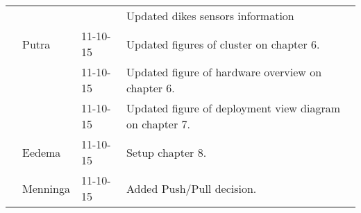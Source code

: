 \begin{longtable}{L{} L{} L{} L{}}
        &           &          & Updated dikes sensors information \\
        & Putra     & 11-10-15 & Updated figures of cluster on chapter 6.\\
        &           & 11-10-15 & Updated figure of hardware overview on chapter 6.\\
        &           & 11-10-15 & Updated figure of deployment view diagram on chapter 7.\\
        & Eedema    & 11-10-15 & Setup chapter 8.\\
        & Menninga  & 11-10-15 & Added Push/Pull decision. \\
    
    \bottomrule
\end{longtable}